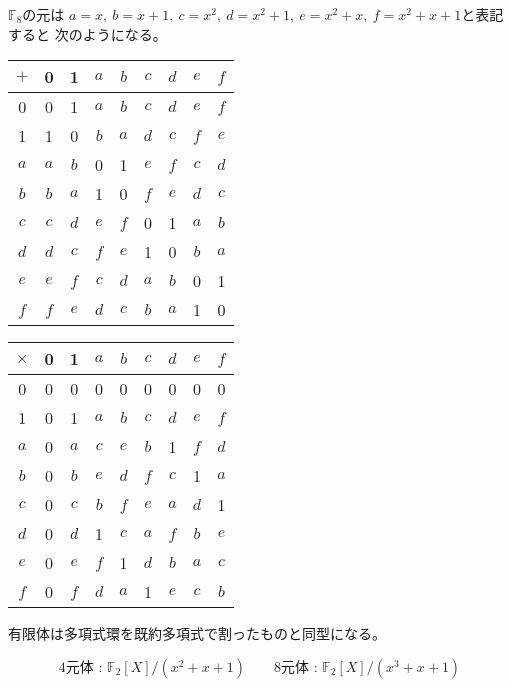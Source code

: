 \documentclass[12pt,b5paper]{ltjsarticle}
\begin{document}
$\mathbb{F}_8$の元は
$a=x ,\ b=x+1 ,\ c=x^2 ,\ d=x^2+1 ,\ e=x^2+x ,\ f=x^2+x+1$と表記すると
次のようになる。

\begin{tabular}{c||c|c|c|c|c|c|c|c}
 $+$ & 0 & 1 & $a$ & $b$ & $c$ & $d$ & $e$ & $f$ \\
 \hline\hline
 0 & 0 & 1 & $a$ & $b$ & $c$ & $d$ & $e$ & $f$ \\
 \hline
 1 & 1 & 0 & $b$ & $a$ & $d$ & $c$ & $f$ & $e$ \\
 \hline
 $a$ & $a$ & $b$ & 0 & 1 & $e$ & $f$ & $c$ & $d$ \\
 \hline
 $b$ & $b$ & $a$ & 1 & 0 & $f$ & $e$ & $d$ & $c$ \\
 \hline
 $c$ & $c$ & $d$ & $e$ & $f$ & 0 & 1 & $a$ & $b$ \\
 \hline
 $d$ & $d$ & $c$ & $f$ & $e$ & 1 & 0 & $b$ & $a$ \\
 \hline
 $e$ & $e$ & $f$ & $c$ & $d$ & $a$ & $b$ & 0 & 1 \\
 \hline
 $f$ & $f$ & $e$ & $d$ & $c$ & $b$ & $a$ & 1 & 0
\end{tabular}
\quad
\begin{tabular}{c||c|c|c|c|c|c|c|c}
 $\times$
     & 0 &  1  & $a$ & $b$ & $c$ & $d$ & $e$ & $f$ \\
 \hline\hline
  0  & 0 &  0  &  0  &  0  &  0  &  0  &  0  &  0 \\
 \hline
  1  & 0 &  1  & $a$ & $b$ & $c$ & $d$ & $e$ & $f$ \\
 \hline
 $a$ & 0 & $a$ & $c$ & $e$ & $b$ &  1  & $f$ & $d$ \\
 \hline
 $b$ & 0 & $b$ & $e$ & $d$ & $f$ & $c$ &  1  & $a$ \\
 \hline
 $c$ & 0 & $c$ & $b$ & $f$ & $e$ & $a$ & $d$ & 1 \\
 \hline
 $d$ & 0 & $d$ &  1 & $c$ & $a$ & $f$ & $b$ & $e$ \\
 \hline
 $e$ & 0 & $e$ & $f$ &  1  & $d$ & $b$ & $a$ & $c$ \\
 \hline
 $f$ & 0 & $f$ & $d$ & $a$ & 1 & $e$ & $c$ & $b$
\end{tabular}

\hrulefill

\hrulefill

有限体は多項式環を既約多項式で割ったものと同型になる。

\begin{equation}
 \text{4元体 : } \mathbb{F}_2[X]/(x^2+x+1)
  \qquad
 \text{8元体 : } \mathbb{F}_2[X]/(x^3+x+1)
\end{equation}
\end{document}
